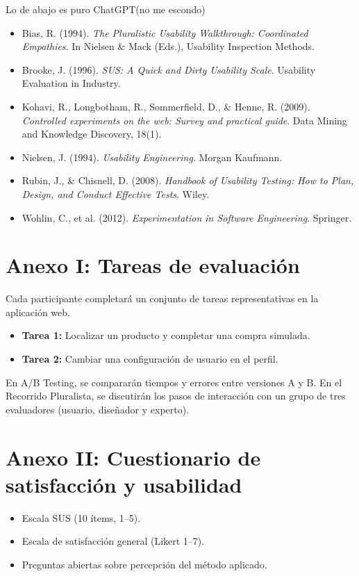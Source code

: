\documentclass[a4paper,12pt]{report}
\begin{document}
Lo de abajo es puro ChatGPT(no me escondo)
\begin{itemize}
    \item Bias, R. (1994). \textit{The Pluralistic Usability Walkthrough: Coordinated Empathies}. In Nielsen \& Mack (Eds.), Usability Inspection Methods.
    \item Brooke, J. (1996). \textit{SUS: A Quick and Dirty Usability Scale}. Usability Evaluation in Industry.
    \item Kohavi, R., Longbotham, R., Sommerfield, D., \& Henne, R. (2009). \textit{Controlled experiments on the web: Survey and practical guide}. Data Mining and Knowledge Discovery, 18(1).
    \item Nielsen, J. (1994). \textit{Usability Engineering}. Morgan Kaufmann.
    \item Rubin, J., \& Chisnell, D. (2008). \textit{Handbook of Usability Testing: How to Plan, Design, and Conduct Effective Tests}. Wiley.
    \item Wohlin, C., et al. (2012). \textit{Experimentation in Software Engineering}. Springer.
\end{itemize}

\cleardoublepage

\printbibliography[heading=bibintoc,title={Bibliografía}]
\appendix

\chapter{Anexo I: Tareas de evaluación}
Cada participante completará un conjunto de tareas representativas en la aplicación web.  
\begin{itemize}
    \item \textbf{Tarea 1:} Localizar un producto y completar una compra simulada.  
    \item \textbf{Tarea 2:} Cambiar una configuración de usuario en el perfil.  
\end{itemize}
En A/B Testing, se compararán tiempos y errores entre versiones A y B.  
En el Recorrido Pluralista, se discutirán los pasos de interacción con un grupo de tres evaluadores (usuario, diseñador y experto).

\chapter{Anexo II: Cuestionario de satisfacción y usabilidad}
\begin{itemize}
    \item Escala SUS (10 ítems, 1--5).  
    \item Escala de satisfacción general (Likert 1--7).  
    \item Preguntas abiertas sobre percepción del método aplicado.  
\end{itemize}
\end{document}
